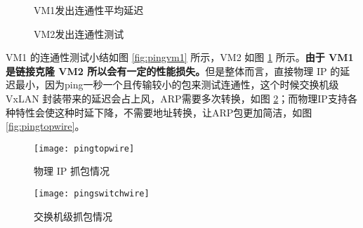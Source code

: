     \begin{figure}[H]
        \centering
        \begin{minipage}{0.48\textwidth}
            \centering
            \caption{VM1发出连通性平均延迟}\label{fig:pingvm1}
        \end{minipage}
        \begin{minipage}{0.48\textwidth}
            \centering
            \caption{VM2发出连通性测试}\label{fig:pingvm2}
        \end{minipage}
    \end{figure}

    VM1 的连通性测试小结如图 \ref{fig:pingvm1} 所示，VM2 如图 \ref{fig:pingvm2} 所示。\textbf{由于 VM1 是链接克隆 VM2 所以会有一定的性能损失。\cite{linkclone}}但是整体而言，直接物理 IP 的延迟最小，因为ping一秒一个且传输较小的包来测试连通性，这个时候交换机级 VxLAN 封装带来的延迟会占上风，ARP需要多次转换，如图 \ref{fig:pingswitchwire}；而物理IP支持各种特性会使这种时延下降，不需要地址转换，让ARP包更加简洁，如图 \ref{fig:pingtopwire}。

    \begin{figure}[H]
        \centering
        \begin{minipage}{0.48\textwidth}
            \centering
            \texttt{[image: pingtopwire]}
            \caption{物理 IP 抓包情况}\label{fig:pingtopwire}
        \end{minipage}
        \begin{minipage}{0.48\textwidth}
            \centering
            \texttt{[image: pingswitchwire]}
            \caption{交换机级抓包情况}\label{fig:pingswitchwire}
        \end{minipage}
    \end{figure}

